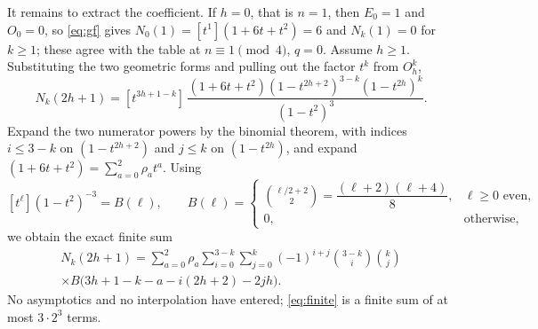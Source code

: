 \documentclass[11pt]{amsart}
\theoremstyle{definition}
\theoremstyle{remark}
\begin{document}
It remains to extract the coefficient. If $h = 0$, that is $n = 1$, then $E_0 = 1$ and $O_0 = 0$, so \cref{eq:gf} gives $N_0(1) = [t^1](1+6t+t^2) = 6$ and $N_k(1) = 0$ for $k \ge 1$; these agree with the table at $n \equiv 1 \pmod 4$, $q = 0$. Assume $h \ge 1$. Substituting the two geometric forms and pulling out the factor $t^k$ from $O_h^k$,
\begin{equation}
N_k(2h+1) = [t^{3h+1-k}]\,
\frac{(1+6t+t^2)(1-t^{2h+2})^{3-k}(1-t^{2h})^{k}}{(1-t^2)^3}.
\label{eq:sub}
\end{equation}
Expand the two numerator powers by the binomial theorem, with indices $i \le 3-k$ on $(1-t^{2h+2})$ and $j \le k$ on $(1-t^{2h})$, and expand $(1+6t+t^2) = \sum_{a=0}^{2}\rho_a t^a$. Using
\[
[t^\ell](1-t^2)^{-3} = B(\ell), \qquad
B(\ell) = \begin{cases} \binom{\ell/2+2}{2} = \dfrac{(\ell+2)(\ell+4)}{8}, & \ell \ge 0 \text{ even},\\[4pt] 0, & \text{otherwise},\end{cases}
\]
we obtain the exact finite sum
\begin{equation}
\begin{multlined}
N_k(2h+1) = \sum_{a=0}^{2}\rho_a \sum_{i=0}^{3-k}\sum_{j=0}^{k}
(-1)^{i+j}\binom{3-k}{i}\binom{k}{j}\\
\times B\bigl(3h{+}1{-}k{-}a{-}i(2h{+}2){-}2jh\bigr).
\end{multlined}
\label{eq:finite}
\end{equation}
No asymptotics and no interpolation have entered; \cref{eq:finite} is a finite sum of at most $3 \cdot 2^3$ terms.
\end{document}

